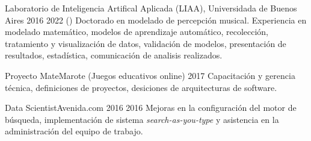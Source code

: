 

\begin{jobitems}
  
  \joblongitemdesc
    {} %
    {Laboratorio de Inteligencia Artifical Aplicada (LIAA), Universidada de
  Buenos Aires} %
    { 2016}{ 2022 ()} %
    {Doctorado en modelado de percepción musical. Experiencia en modelado
    matemático, modelos de aprendizaje automático, recolección, tratamiento y
    visualización de datos, validación de modelos, presentación de resultados,
    estadística, comunicación de analisis realizados.}
  
  \jobitemdesc
    {}
    {
    {Proyecto MateMarote (Juegos educativos online)}}
    { 2017}
    {}
    {Capacitación y gerencia técnica, definiciones de proyectos, desiciones de
    arquitecturas de software.}

  \jobitemdesc
    {Data Scientist}{Avenida.com}
    { 2016}{ 2016}
    {
    {Mejoras en la configuración del motor de búsqueda, implementación de
    sistema \emph{search-as-you-type} y asistencia en la administración del equipo
  de trabajo.}
    }


\end{jobitems}




